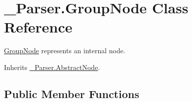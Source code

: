 \hypertarget{class__1920_parser_1_1_group_node}{}\section{\+\_\+Parser.\+Group\+Node Class Reference}
\label{class__1920_parser_1_1_group_node}


\hyperlink{class__1920_parser_1_1_group_node}{Group\+Node} represents an internal node.  




Inherits \hyperlink{class__1920_parser_1_1_abstract_node}{\+\_\+Parser.\+Abstract\+Node}.

\subsection*{Public Member Functions}
